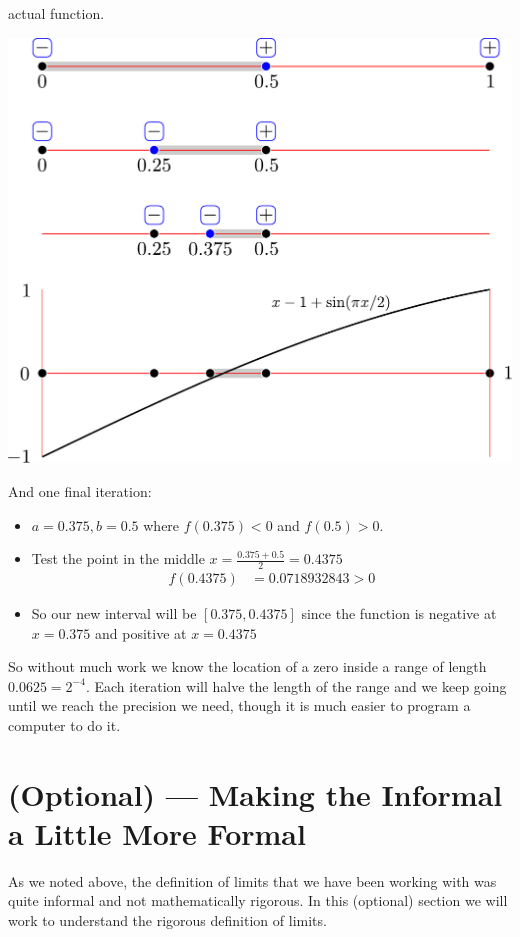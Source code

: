\begin{eg}
actual function.
\begin{efig}
 \begin{center}
  \includegraphics[width=\textwidth]{ivt_eg}
 \end{center}
\end{efig}

And one final iteration:
\begin{itemize}
 \item $a=0.375, b=0.5$ where $f(0.375)<0$ and $f(0.5)>0$.
 \item Test the point in the middle $x = \frac{0.375+0.5}{2} = 0.4375$
\begin{align*}
  f(0.4375) &= 0.0718932843>0
\end{align*}
\item So our new interval will be $[0.375,0.4375]$ since the function is
negative at $x=0.375$ and positive at $x=0.4375$
\end{itemize}
So without much work we know the location of a zero inside a range of length
$0.0625 = 2^{-4}$. Each iteration will halve the length of the range and we
keep going until we reach the precision we need, though it is much easier to
program a computer to do it.
\end{eg}

\section{(Optional) --- Making the Informal a Little More Formal}
\label{sec opt formal limit}
As we noted above, the definition of limits that we have been working with was
quite informal and not mathematically rigorous. In this (optional) section we
will work to understand the rigorous definition of limits.

